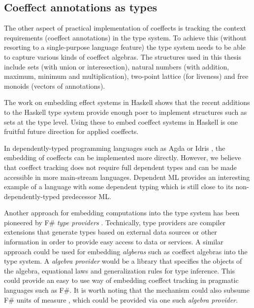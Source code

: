 \subsection{Coeffect annotations as types}
\label{sec:unified-impl-types}

The other aspect of practical implementation of coeffects is tracking the context requirements
(coeffect annotations) in the type system. To achieve this (without resorting to a single-purpose
language feature) the type system needs to be able to capture various kinds of coeffect algebras. 
The structures used in this thesis include sets (with union or interesection), natural numbers (with 
addition, maximum, minimum and multiplication), two-point lattice (for liveness) and free monoids 
(vectors of annotations).

The work on embedding effect systems in Haskell \cite{effects-embedding} shows that the
recent additions to the Haskell type system provide enough poer to implement structures such
as sets at the type level. Using these to embed coeffect systems in Haskell is one fruitful 
future direction for applied coeffects.  

In dependently-typed programming languages such as Agda \cite{other-agda} or Idris \cite{other-idris},
the embedding of coeffects can be implemented more directly. However, we believe that coeffect
tracking does not require full dependent types and can be made accessible in more main-stream
languages. Dependent ML \cite{types-dependent-ml} provides an interesting example of a language
with some dependent typing which is still close to its non-dependently-typed predecessor ML.

Another approach for embedding computations into the type system has been pioneered by F\#
\emph{type providers} \cite{app-inforich}. Technically, type providers are compiler extensions 
that generate types based on external data sources or other information in order to provide easy 
access to data or services. A similar approach could be used for embedding \emph{algberas} such
as coeffect algebras into the type system. A \emph{algebra provider} would be a library that 
specifies the objects of the algebra, equational laws and generalization rules for type inference.
This could provide an easy to use way of embedding coeffect tracking in pragmatic languages
such as F\#. It is worth noting that the mechanism could also subsume F\# units of measure
\cite{types-units-of-measure}, which could be provided via one such \emph{algebra provider}.

